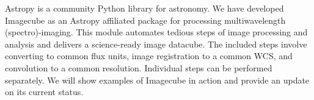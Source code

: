 Astropy is a community Python library for astronomy.
We have developed Imagecube as an Astropy affiliated package for  processing  multiwavelength
(spectro)-imaging.
This  module  automates  tedious  steps  of  image  processing  and
analysis  and  delivers  a  science-ready  image  datacube.
The  included  steps  involve  converting  to  common  flux  units, image  registration
to  a  common  WCS,  and  convolution  to  a  common  resolution.
Individual  steps  can  be  performed separately.
We will show examples of Imagecube in action and provide an update on its current status.

